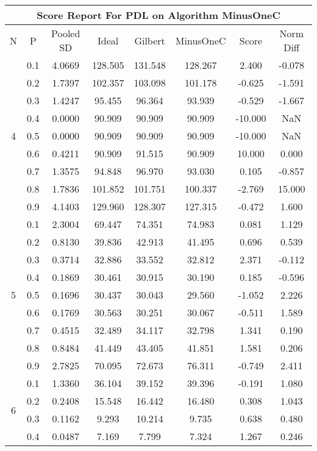 \documentclass[11pt,a4paper]{report}
\begin{document}
\begin{longtable}{ | c | c || c | c | c | c | c | c | }
\hline
\multicolumn{8}{|c|}{ Score Report For PDL on Algorithm MinusOneC} \\
\hline
N & P & Pooled SD &  Ideal &  Gilbert & MinusOneC  & Score & Norm Diff \\
 \hline
 \hline
 \endhead
\multirow{9}{*}{4} & 0.1 & 4.0669 & 128.505 & 131.548 & 128.267 & 2.400 & -0.078 \\
 & 0.2 & 1.7397 & 102.357 & 103.098 & 101.178 & -0.625 & -1.591 \\
 & 0.3 & 1.4247 & 95.455 & 96.364 & 93.939 & -0.529 & -1.667 \\
 & 0.4 & 0.0000 & 90.909 & 90.909 & 90.909 & -10.000 & NaN \\
 & 0.5 & 0.0000 & 90.909 & 90.909 & 90.909 & -10.000 & NaN \\
 & 0.6 & 0.4211 & 90.909 & 91.515 & 90.909 & 10.000 & 0.000 \\
 & 0.7 & 1.3575 & 94.848 & 96.970 & 93.030 & 0.105 & -0.857 \\
 & 0.8 & 1.7836 & 101.852 & 101.751 & 100.337 & -2.769 & 15.000 \\
 & 0.9 & 4.1403 & 129.960 & 128.307 & 127.315 & -0.472 & 1.600 \\
 \hline
\multirow{9}{*}{5} & 0.1 & 2.3004 & 69.447 & 74.351 & 74.983 & 0.081 & 1.129 \\
 & 0.2 & 0.8130 & 39.836 & 42.913 & 41.495 & 0.696 & 0.539 \\
 & 0.3 & 0.3714 & 32.886 & 33.552 & 32.812 & 2.371 & -0.112 \\
 & 0.4 & 0.1869 & 30.461 & 30.915 & 30.190 & 0.185 & -0.596 \\
 & 0.5 & 0.1696 & 30.437 & 30.043 & 29.560 & -1.052 & 2.226 \\
 & 0.6 & 0.1769 & 30.563 & 30.251 & 30.067 & -0.511 & 1.589 \\
 & 0.7 & 0.4515 & 32.489 & 34.117 & 32.798 & 1.341 & 0.190 \\
 & 0.8 & 0.8484 & 41.449 & 43.405 & 41.851 & 1.581 & 0.206 \\
 & 0.9 & 2.7825 & 70.095 & 72.673 & 76.311 & -0.749 & 2.411 \\
 \hline
\multirow{9}{*}{6} & 0.1 & 1.3360 & 36.104 & 39.152 & 39.396 & -0.191 & 1.080 \\
 & 0.2 & 0.2408 & 15.548 & 16.442 & 16.480 & 0.308 & 1.043 \\
 & 0.3 & 0.1162 & 9.293 & 10.214 & 9.735 & 0.638 & 0.480 \\
 & 0.4 & 0.0487 & 7.169 & 7.799 & 7.324 & 1.267 & 0.246 \\

\end{longtable}
\end{document}
